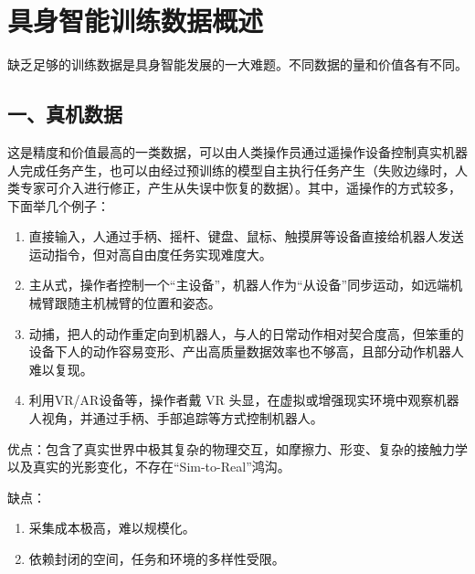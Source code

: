 \setcounter{section}{0}

\hypertarget{ux5177ux8eabux667aux80fdux8badux7ec3ux6570ux636eux6982ux8ff0}{%
\section{具身智能训练数据概述}\label{ux5177ux8eabux667aux80fdux8badux7ec3ux6570ux636eux6982ux8ff0}}

缺乏足够的训练数据是具身智能发展的一大难题。不同数据的量和价值各有不同。

\hypertarget{ux4e00ux771fux673aux6570ux636e}{%
\subsection{一、真机数据}\label{ux4e00ux771fux673aux6570ux636e}}

这是精度和价值最高的一类数据，可以由人类操作员通过遥操作设备控制真实机器人完成任务产生，也可以由经过预训练的模型自主执行任务产生（失败边缘时，人类专家可介入进行修正，产生从失误中恢复的数据）。其中，遥操作的方式较多，下面举几个例子：

\begin{enumerate}
\def\labelenumi{\arabic{enumi}.}
\item
  直接输入，人通过手柄、摇杆、键盘、鼠标、触摸屏等设备直接给机器人发送运动指令，但对高自由度任务实现难度大。
\item
  主从式，操作者控制一个``主设备''，机器人作为``从设备''同步运动，如远端机械臂跟随主机械臂的位置和姿态。
\item
  动捕，把人的动作重定向到机器人，与人的日常动作相对契合度高，但笨重的设备下人的动作容易变形、产出高质量数据效率也不够高，且部分动作机器人难以复现。
\item
  利用VR/AR设备等，操作者戴 VR 头显，在虚拟或增强现实环境中观察机器人视角，并通过手柄、手部追踪等方式控制机器人。
\end{enumerate}

优点：包含了真实世界中极其复杂的物理交互，如摩擦力、形变、复杂的接触力学以及真实的光影变化，不存在``Sim-to-Real''鸿沟。

缺点：

\begin{enumerate}
\def\labelenumi{\arabic{enumi}.}
\item
  采集成本极高，难以规模化。
\item
  依赖封闭的空间，任务和环境的多样性受限。
\end{enumerate}


